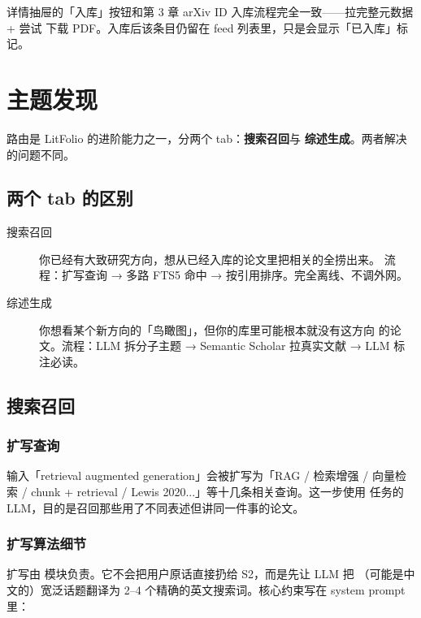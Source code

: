 详情抽屉的「入库」按钮和第 3 章 arXiv ID 入库流程完全一致——拉完整元数据 + 尝试
下载 PDF。入库后该条目仍留在 feed 列表里，只是会显示「已入库」标记。

\chapter{主题发现}
\label{ch:topic}

 路由是 LitFolio 的进阶能力之一，分两个 tab：\textbf{搜索召回}与
\textbf{综述生成}。两者解决的问题不同。

\section{两个 tab 的区别}

\begin{description}
  \item[搜索召回] 你已经有大致研究方向，想从已经入库的论文里把相关的全捞出来。
    流程：扩写查询 → 多路 FTS5 命中 → 按引用排序。完全离线、不调外网。
  \item[综述生成] 你想看某个新方向的「鸟瞰图」，但你的库里可能根本就没有这方向
    的论文。流程：LLM 拆分子主题 → Semantic Scholar 拉真实文献 → LLM 标注必读。
\end{description}

\section{搜索召回}


\subsection{扩写查询}

输入「retrieval augmented generation」会被扩写为「RAG / 检索增强 / 向量检索 /
chunk + retrieval / Lewis 2020...」等十几条相关查询。这一步使用 
任务的 LLM，目的是召回那些用了不同表述但讲同一件事的论文。

\subsection{扩写算法细节}

扩写由  模块负责。它不会把用户原话直接扔给 S2，而是先让 LLM 把
（可能是中文的）宽泛话题翻译为 2–4 个精确的英文搜索词。核心约束写在 system prompt 里：

